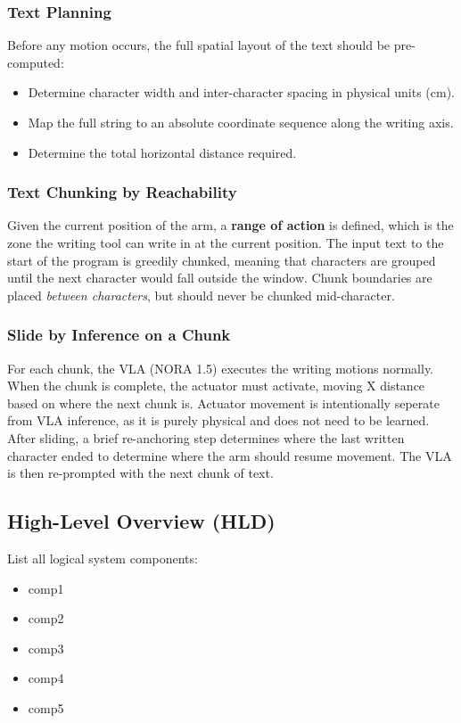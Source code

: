 \documentclass[12pt,a4paper]{article}
\begin{document}
\subsubsection*{Text Planning}

Before any motion occurs, the full spatial layout of the text should be pre-computed:
\begin{itemize}
  \item Determine character width and inter-character spacing in physical units (cm).
  \item Map the full string to an absolute coordinate sequence along the writing axis.
  \item Determine the total horizontal distance required.
\end{itemize}

\subsubsection*{Text Chunking by Reachability}

Given the current position of the arm, a \textbf{range of action} is defined, which is the zone the writing tool can write in at the current position. The input text to the start of the program is greedily chunked, meaning that characters are grouped until the next character would fall outside the window. Chunk boundaries are placed \emph{between characters}, but should never be chunked mid-character.

\subsubsection*{Slide by Inference on a Chunk}

For each chunk, the VLA (NORA 1.5) executes the writing motions normally. When the chunk is complete, the actuator must activate, moving X distance based on where the next chunk is. Actuator movement is intentionally seperate from VLA inference, as it is purely physical and does not need to be learned. After sliding, a brief re-anchoring step determines where the last written character ended to determine where the arm should resume movement. The VLA is then re-prompted with the next chunk of text.

\subsection{High-Level Overview (HLD)}
List all logical system components:
\begin{itemize}
  \item comp1
  \item comp2
  \item comp3
  \item comp4
  \item comp5
\end{itemize}
\end{document}
